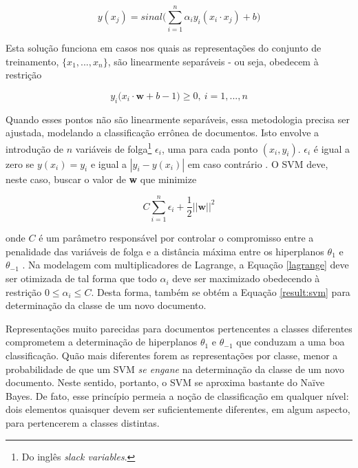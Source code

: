 \begin{equation}
\label{result:svm}
\ensuremath{y(x_j) = sinal\bigg(\sum_{i = 1}^n \alpha_iy_i(x_i \cdot x_j) + b\bigg)} %
\end{equation}

Esta solução funciona em casos nos quais as representações do conjunto de treinamento, \ensuremath{\{x_1, ..., x_n\}}, são linearmente separáveis - ou seja, obedecem à restrição \cite{mono-puc}

\begin{equation}
\label{restr2:svm}
\ensuremath{y_i(x_i \cdot} \textbf{w} + \ensuremath{b -1) \geq 0,\ i = 1,...,n}
\end{equation}

Quando esses pontos não são linearmente separáveis, essa metodologia precisa ser ajustada, modelando a classificação errônea de documentos. Isto envolve a introdução de \ensuremath{n} variáveis de folga\footnote{Do inglês \emph{slack variables}.} \ensuremath{\epsilon_i}, uma para cada ponto \ensuremath{(x_i, y_i)}. \ensuremath{\epsilon_i} é igual a zero se \ensuremath{y(x_i) = y_i} e igual a \ensuremath{|y_i - y(x_i)|} em caso contrário \cite{bishop}. O SVM deve, neste caso, buscar o valor de \textbf{w} que minimize \cite{mono-puc}

\begin{equation}
\label{nonlin:svm}
\ensuremath{C\sum_{i=1}^n\epsilon_i + \frac{1}{2}||}\textbf{w}\ensuremath{||^2}
\end{equation}

onde \ensuremath{C} é um parâmetro responsável por controlar o compromisso entre a penalidade das variáveis de folga e a distância máxima entre os hiperplanos \ensuremath{\theta_1} e \ensuremath{\theta_{-1}} \cite{mono-puc}. Na modelagem com multiplicadores de Lagrange, a Equação \ref{lagrange} deve ser otimizada de tal forma que todo \ensuremath{\alpha_i} deve ser maximizado obedecendo à restrição \ensuremath{0 \leq \alpha_i \leq C}. Desta forma, também se obtém a Equação \ref{result:svm} para determinação da classe de um novo documento.

Representações muito parecidas para documentos pertencentes a classes diferentes comprometem a determinação de hiperplanos \ensuremath{\theta_1} e \ensuremath{\theta_{-1}} que conduzam a uma boa classificação. Quão mais diferentes forem as representações por classe, menor a probabilidade de que um SVM \emph{se engane} na determinação da classe de um novo documento. Neste sentido, portanto, o SVM se aproxima bastante do Naïve Bayes. De fato, esse princípio permeia a noção de classificação em qualquer nível: dois elementos quaisquer devem ser suficientemente diferentes, em algum aspecto, para pertencerem a classes distintas.

